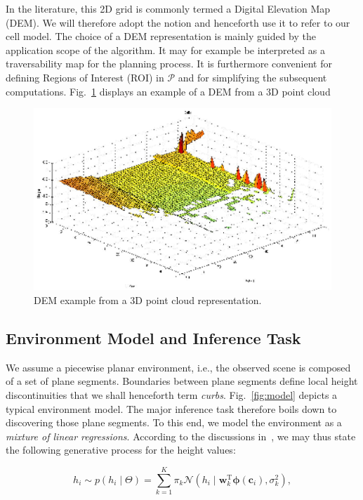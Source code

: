 In the literature, this 2D grid is commonly termed a Digital Elevation
Map (DEM). We will therefore adopt the notion and henceforth use it to refer to
our cell model. The choice of a DEM representation is mainly guided by the
application scope of the algorithm. It may for example be interpreted as a
traversability map for the planning process. It is furthermore convenient for
defining Regions of Interest (ROI) in $\mathcal{P}$ and for simplifying the
subsequent computations. Fig.~\ref{fig:dem} displays an example of a DEM from a
3D point cloud

\begin{figure}[t]
\centering
\includegraphics[width=\columnwidth]{fig/dem.eps}
\caption{DEM example from a 3D point cloud representation.}
\label{fig:dem}
\end{figure}

\subsection{Environment Model and Inference Task}
We assume a piecewise planar environment, i.e., the observed scene is composed
of a set of plane segments. Boundaries between plane segments define local
height discontinuities that we shall henceforth term \emph{curbs}.
Fig.~\ref{fig:model} depicts a typical environment model. The major
inference task therefore boils down to discovering those plane segments. To this
end, we model the environment as a \emph{mixture of linear regressions}.
According to the discussions in~\cite{bishop06pattern}, we may thus state the
following generative process for the height values:

\begin{equation}
\label{eqn:mixture}
h_i\sim p(h_i\mid\Theta)=\sum_{k=1}^K\pi_k\mathcal{N}(h_i\mid
\mathbf{w}_k^\text{T}\boldsymbol{\phi}(\mathbf{c}_i),\sigma^2_k),
\end{equation}

